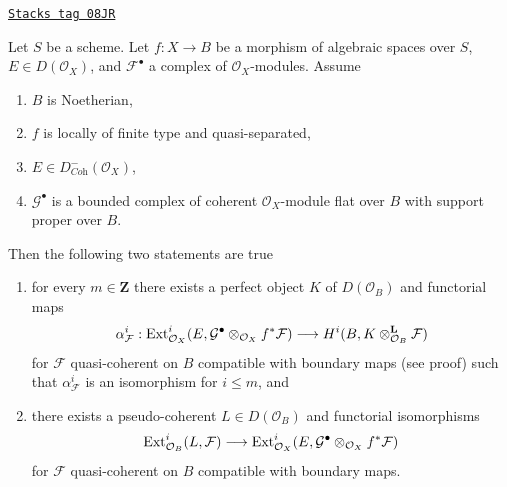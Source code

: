 \begin{lemma}
\label{spaces-perfect-lemma-compute-ext}
\href{https://stacks.math.columbia.edu/tag/08JR}{\texttt{Stacks tag 08JR}}

Let $S$ be a scheme. Let $f : X \to B$ be a morphism of algebraic spaces
over $S$, $E \in D(\mathcal{O}_X)$, and $\mathcal{F}^\bullet$ a complex
of $\mathcal{O}_X$-modules. Assume
\begin{enumerate}
\item $B$ is Noetherian,
\item $f$ is locally of finite type and quasi-separated,
\item $E \in D^-_{\textit{Coh}}(\mathcal{O}_X)$,
\item $\mathcal{G}^\bullet$ is a bounded complex of coherent
$\mathcal{O}_X$-module flat over $B$ with support proper over $B$.
\end{enumerate}
Then the following two statements are true
\begin{enumerate}
\item[(A)] for every $m \in \mathbf{Z}$ there exists a perfect object $K$
of $D(\mathcal{O}_B)$ and functorial maps
$$
\alpha^i_\mathcal{F} :
\operatorname{Ext}^i_{\mathcal{O}_X}(E,
\mathcal{G}^\bullet \otimes_{\mathcal{O}_X} f^*\mathcal{F})
\longrightarrow
H^i(B, K \otimes^\mathbf{L}_{\mathcal{O}_B} \mathcal{F})
$$
for $\mathcal{F}$ quasi-coherent on $B$
compatible with boundary maps (see proof)
such that $\alpha^i_\mathcal{F}$ is an isomorphism for $i \leq m$, and
\item[(B)] there exists a pseudo-coherent $L \in D(\mathcal{O}_B)$
and functorial isomorphisms
$$
\operatorname{Ext}^i_{\mathcal{O}_B}(L, \mathcal{F}) \longrightarrow
\operatorname{Ext}^i_{\mathcal{O}_X}(E,
\mathcal{G}^\bullet \otimes_{\mathcal{O}_X} f^*\mathcal{F})
$$
for $\mathcal{F}$ quasi-coherent on $B$ compatible with boundary maps.
\end{enumerate}
\end{lemma}


